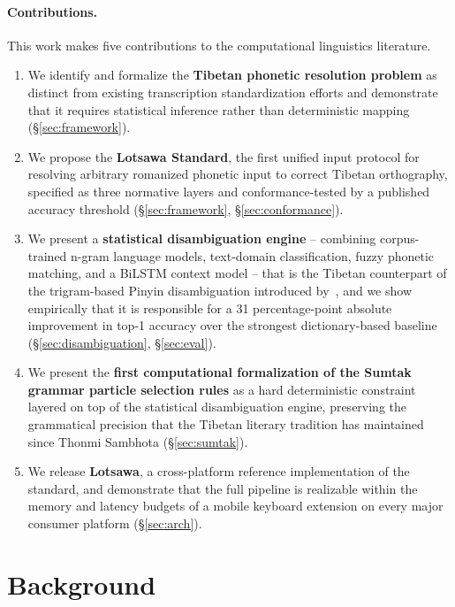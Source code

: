\documentclass[11pt]{article}
\begin{document}
\paragraph{Contributions.} This work makes five contributions to the computational linguistics literature.

\begin{enumerate}
\item We identify and formalize the \textbf{Tibetan phonetic resolution problem} as distinct from existing transcription standardization efforts and demonstrate that it requires statistical inference rather than deterministic mapping (\S\ref{sec:framework}).

\item We propose the \textbf{Lotsawa Standard}, the first unified input protocol for resolving arbitrary romanized phonetic input to correct Tibetan orthography, specified as three normative layers and conformance-tested by a published accuracy threshold (\S\ref{sec:framework}, \S\ref{sec:conformance}).

\item We present a \textbf{statistical disambiguation engine} -- combining corpus-trained n-gram language models, text-domain classification, fuzzy phonetic matching, and a BiLSTM context model -- that is the Tibetan counterpart of the trigram-based Pinyin disambiguation introduced by~\citet{chen2000pinyin}, and we show empirically that it is responsible for a 31 percentage-point absolute improvement in top-1 accuracy over the strongest dictionary-based baseline (\S\ref{sec:disambiguation}, \S\ref{sec:eval}).

\item We present the \textbf{first computational formalization of the Sumtak grammar particle selection rules} as a hard deterministic constraint layered on top of the statistical disambiguation engine, preserving the grammatical precision that the Tibetan literary tradition has maintained since Thonmi Sambhota (\S\ref{sec:sumtak}).

\item We release \textbf{Lotsawa}, a cross-platform reference implementation of the standard, and demonstrate that the full pipeline is realizable within the memory and latency budgets of a mobile keyboard extension on every major consumer platform (\S\ref{sec:arch}).
\end{enumerate}

\section{Background}
\label{sec:background}
\end{document}
